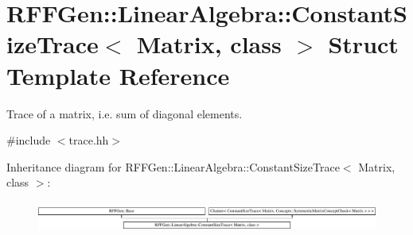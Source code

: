 \hypertarget{structRFFGen_1_1LinearAlgebra_1_1ConstantSizeTrace}{\section{R\-F\-F\-Gen\-:\-:Linear\-Algebra\-:\-:Constant\-Size\-Trace$<$ Matrix, class $>$ Struct Template Reference}
\label{structRFFGen_1_1LinearAlgebra_1_1ConstantSizeTrace}
}


Trace of a matrix, i.\-e. sum of diagonal elements.  




{\ttfamily \#include $<$trace.\-hh$>$}

Inheritance diagram for R\-F\-F\-Gen\-:\-:Linear\-Algebra\-:\-:Constant\-Size\-Trace$<$ Matrix, class $>$\-:\begin{figure}[H]
\begin{center}
\leavevmode
\includegraphics[height=1.005386cm]{structRFFGen_1_1LinearAlgebra_1_1ConstantSizeTrace}
\end{center}
\end{figure}
